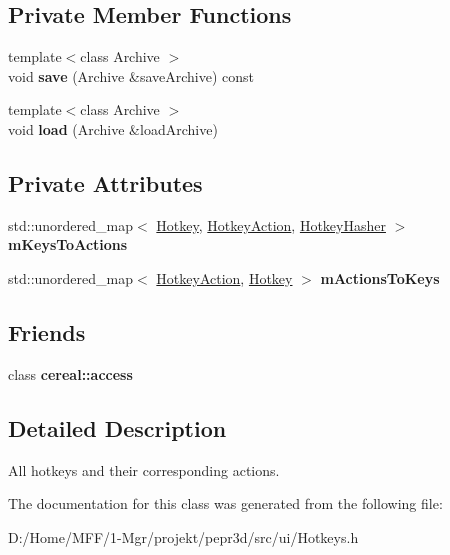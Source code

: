 \subsection*{Private Member Functions}
\begin{DoxyCompactItemize}
\item 
\mbox{\label{classpepr3d_1_1_hotkeys_a09f080ad99f8f9b74f32be2758ff6680}} 
{\footnotesize template$<$class Archive $>$ }\\void {\bfseries save} (Archive \&save\+Archive) const
\item 
\mbox{\label{classpepr3d_1_1_hotkeys_a2f2a9f76a541573fe059f24bca1ace54}} 
{\footnotesize template$<$class Archive $>$ }\\void {\bfseries load} (Archive \&load\+Archive)
\end{DoxyCompactItemize}
\subsection*{Private Attributes}
\begin{DoxyCompactItemize}
\item 
\mbox{\label{classpepr3d_1_1_hotkeys_ace32a0c35b2c80135b45460dca1fd313}} 
std\+::unordered\+\_\+map$<$ \mbox{\hyperlink{structpepr3d_1_1_hotkey}{Hotkey}}, \mbox{\hyperlink{namespacepepr3d_ae35d8dfd4e5925d633f100eb9b525cbe}{Hotkey\+Action}}, \mbox{\hyperlink{structpepr3d_1_1_hotkey_hasher}{Hotkey\+Hasher}} $>$ {\bfseries m\+Keys\+To\+Actions}
\item 
\mbox{\label{classpepr3d_1_1_hotkeys_afd769fcf12839dafab79c6d4da780412}} 
std\+::unordered\+\_\+map$<$ \mbox{\hyperlink{namespacepepr3d_ae35d8dfd4e5925d633f100eb9b525cbe}{Hotkey\+Action}}, \mbox{\hyperlink{structpepr3d_1_1_hotkey}{Hotkey}} $>$ {\bfseries m\+Actions\+To\+Keys}
\end{DoxyCompactItemize}
\subsection*{Friends}
\begin{DoxyCompactItemize}
\item 
\mbox{\label{classpepr3d_1_1_hotkeys_ab2f44cbb59a08132f4c843e5225bba0e}} 
class {\bfseries cereal\+::access}
\end{DoxyCompactItemize}


\subsection{Detailed Description}
All hotkeys and their corresponding actions. 

The documentation for this class was generated from the following file\+:\begin{DoxyCompactItemize}
\item 
D\+:/\+Home/\+M\+F\+F/1-\/\+Mgr/projekt/pepr3d/src/ui/Hotkeys.\+h\end{DoxyCompactItemize}

